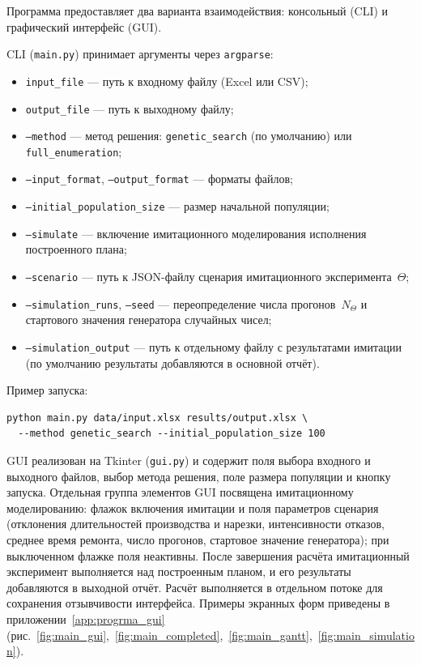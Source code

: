 Программа предоставляет два варианта взаимодействия: консольный (CLI) и графический интерфейс (GUI).

CLI (\texttt{main.py}) принимает аргументы через \texttt{argparse}:
\begin{itemize}
  \item \texttt{input\_file} --- путь к входному файлу (Excel или CSV);
  \item \texttt{output\_file} --- путь к выходному файлу;
  \item \texttt{--method} --- метод решения: \texttt{genetic\_search} (по умолчанию) или \texttt{full\_enumeration};
  \item \texttt{--input\_format}, \texttt{--output\_format} --- форматы файлов;
  \item \texttt{--initial\_population\_size} --- размер начальной популяции;
  \item \texttt{--simulate} --- включение имитационного моделирования исполнения построенного плана;
  \item \texttt{--scenario} --- путь к JSON-файлу сценария имитационного эксперимента~$\Theta$;
  \item \texttt{--simulation\_runs}, \texttt{--seed} --- переопределение числа прогонов~$N_{\Theta}$ и стартового значения генератора случайных чисел;
  \item \texttt{--simulation\_output} --- путь к отдельному файлу с результатами имитации (по умолчанию результаты добавляются в основной отчёт).
\end{itemize}
Пример запуска:
\begin{verbatim}
python main.py data/input.xlsx results/output.xlsx \
  --method genetic_search --initial_population_size 100
\end{verbatim}

GUI реализован на Tkinter (\texttt{gui.py}) и содержит поля выбора входного и выходного файлов, выбор метода решения, поле размера популяции и кнопку запуска.
Отдельная группа элементов GUI посвящена имитационному моделированию: флажок включения имитации и поля параметров сценария (отклонения длительностей производства и нарезки, интенсивности отказов, среднее время ремонта, число прогонов, стартовое значение генератора); при выключенном флажке поля неактивны. После завершения расчёта имитационный эксперимент выполняется над построенным планом, и его результаты добавляются в выходной отчёт.
Расчёт выполняется в отдельном потоке для сохранения отзывчивости интерфейса.
Примеры экранных форм приведены в приложении~\ref{app:progrma_gui} (рис.~\ref{fig:main_gui},~\ref{fig:main_completed},~\ref{fig:main_gantt},~\ref{fig:main_simulation}).

